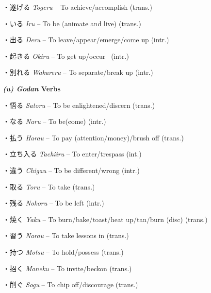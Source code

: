 \par{・遂げる \emph{Togeru }– To achieve\slash accomplish (trans.) }

\par{・いる \emph{Iru }– To be (animate and live) (trans.) }

\par{・出る \emph{Deru }– To leave\slash appear\slash emerge\slash come up (intr.) }

\par{・起きる \emph{Okiru }– To get up\slash occur  (intr.) }

\par{・別れる \emph{Wakareru }– To separate\slash break up (intr.) }

\par{\textbf{\emph{(u) Godan }Verbs }}

\par{・悟る \emph{Satoru }– To be enlightened\slash discern (trans.) }

\par{・なる \emph{Naru }– To be(come) (intr.) }

\par{・払う \emph{Harau }– To pay (attention\slash money)\slash brush off (trans.) }

\par{・立ち入る \emph{Tachi\textquotesingle iru }– To enter\slash trespass (int.) }

\par{・違う \emph{Chigau }– To be different\slash wrong (intr.) }

\par{・取る \emph{Toru }– To take (trans.) }

\par{・残る \emph{Nokoru }– To be left (intr.) }

\par{・焼く \emph{Yaku }– To burn\slash bake\slash toast\slash heat up\slash tan\slash burn (disc) (trans.) }

\par{・習う \emph{Narau }– To take lessons in (trans.) }

\par{・持つ \emph{Motsu }– To hold\slash possess (trans.) }

\par{・招く \emph{Maneku }– To invite\slash beckon (trans.) }

\par{・削ぐ \emph{Sogu }– To chip off\slash discourage (trans.) }


